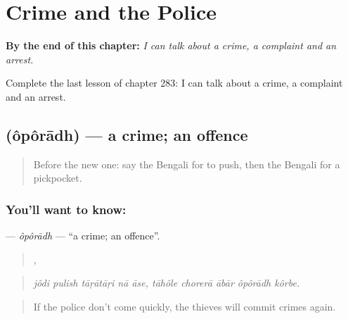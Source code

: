 
\chapter{Crime and the Police}
\label{ch:bn-crime-and-the-police}

\begin{chapteropening}
\textbf{By the end of this chapter:} \emph{I can talk about a crime, a complaint and an arrest.}

Complete the last lesson of chapter 283: I can talk about a crime, a complaint and an arrest.
\end{chapteropening}

\section[\texorpdfstring{\bn{অপরাধ} (ôpôrādh)}{অপরাধ (ôpôrādh)}]{ (ôpôrādh) — a crime; an offence}

\label{lesson:BN-C283-oporadh}



\begin{quote}
Before the new one: say the Bengali for to push, then the Bengali for a pickpocket.
\end{quote}

\subsection*{You'll want to know: }
\textbf{} — \emph{ôpôrādh} — \textquotedblleft{}a crime; an offence\textquotedblright{}.

\begin{quote}
    ,     
\end{quote}

\begin{quote}
\emph{jôdi pulish tāṛātāṛi nā āse, tāhôle chorerā ābār ôpôrādh kôrbe.}
\end{quote}

\begin{quote}
If the police don't come quickly, the thieves will commit crimes again.
\end{quote}

